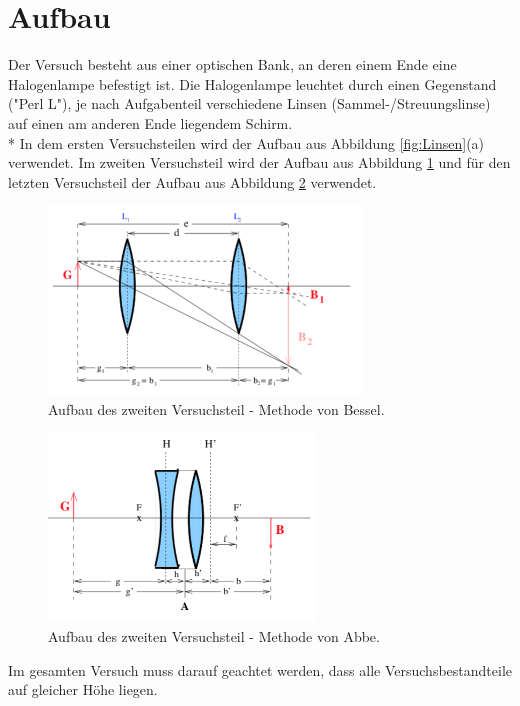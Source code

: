 \newpage
\section{Aufbau}
\label{Aufbau}
Der Versuch besteht aus einer optischen Bank, an deren einem Ende eine Halogenlampe befestigt ist. Die Halogenlampe leuchtet durch einen Gegenstand ("Perl L"), je nach Aufgabenteil verschiedene Linsen (Sammel-/Streuungslinse) auf einen am anderen Ende liegendem Schirm. \\*
In dem ersten Versuchsteilen wird der Aufbau aus Abbildung \ref{fig:Linsen}(a) verwendet. 
Im zweiten Versuchsteil wird der Aufbau aus Abbildung \ref{fig:Aufbau2} und für den letzten Versuchsteil der Aufbau aus Abbildung \ref{fig:Aufbau3} verwendet.
\begin{figure}[H]
  \centering
  \includegraphics[height=5cm]{Aufbau/Aufbau2.pdf}
  \caption{Aufbau des zweiten Versuchsteil - Methode von Bessel.}
  \label{fig:Aufbau2}
\end{figure}
\begin{figure}[H]
  \centering
  \includegraphics[height=5cm]{Aufbau/Aufbau3.pdf}
  \caption{Aufbau des zweiten Versuchsteil - Methode von Abbe.}
  \label{fig:Aufbau3}
\end{figure}
Im gesamten Versuch muss darauf geachtet werden, dass alle Versuchsbestandteile auf gleicher Höhe liegen.